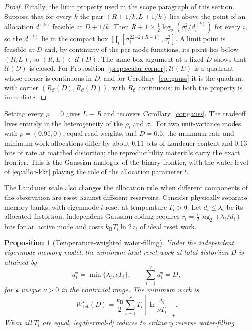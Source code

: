 \documentclass[letterpaper,onecolumn]{IEEEtran}
\newtheorem{proposition}{Proposition}
\theoremstyle{definition}
\theoremstyle{remark}
\newcommand{\cC}{\mathcal{C}}
\newcommand{\1}{\mathbf{1}}
\newcommand{\kb}{k_{\mathrm B}}
\begin{document}
\begin{proof}
Finally, the limit property used in the scope paragraph of this section.
Suppose that for every $k$ the pair $(R+1/k,L+1/k)$ lies above the point of an
allocation $d^{(k)}$ feasible at $D+1/k$. Then
$R+1\ge\frac12\log_2(\sigma_i^2/d^{(k)}_i)$ for every $i$, so the $d^{(k)}$
lie in the compact box $\prod_i[\sigma_i^22^{-2(R+1)},\sigma_i^2]$. A limit
point is feasible at $D$ and, by continuity of the per-mode functions, its
point lies below $(R,L)$, so $(R,L)\in\mathcal U(D)$. The same box argument
at a fixed $D$ shows that $\mathcal U(D)$ is closed. For
Proposition~\ref{prop:scalar-corner}, $\mathcal U(D)$ is a quadrant whose
corner is continuous in $D$, and for Corollary~\ref{cor:gauss} it is the
quadrant with corner $(R_{\cC}(D),R_{\cC}(D))$, with $R_{\cC}$ continuous; in
both the property is immediate.
\end{proof}

Setting every $\rho_i=0$ gives $L\equiv R$ and recovers
Corollary~\ref{cor:gauss}. The tradeoff lives entirely in the heterogeneity
of the $\rho_i$ and $\sigma_i$. For two unit-variance modes with
$\rho=(0.95,0)$, equal read weights, and $D=0.5$, the minimum-rate and
minimum-work allocations differ by about $0.11$ bits of Landauer content and
$0.13$ bits of rate at matched distortion; the reproducibility materials
carry the exact frontier. This is the Gaussian analogue of the binary
frontier, with the water level of \eqref{eq:alloc-kkt} playing the role of
the allocation parameter $t$.

The Landauer scale also changes the allocation rule when different components
of the observation are reset against different reservoirs. Consider physically
separate memory banks, with eigenmode $i$ reset at temperature $T_i>0$. Let
$d_i\le\lambda_i$ be its allocated distortion. Independent Gaussian coding
requires $r_i=\frac12\log_2(\lambda_i/d_i)$ bits for an active mode and costs
$\kb T_i\ln2\,r_i$ of ideal reset work.

\begin{proposition}[Temperature-weighted water-filling]\label{prop:thermal-waterfill}
Under the independent eigenmode memory model, the minimum ideal reset work at
total distortion $D$ is attained by
\begin{equation}
 d_i^{\star}=\min\{\lambda_i,\nu T_i\},
 \qquad
 \sum_{i=1}^{r}d_i^{\star}=D,
 \label{eq:thermal-d}
\end{equation}
for a unique $\nu>0$ in the nontrivial range. The minimum work is
\begin{equation}
 \boxed{
 W_{\mathrm{het}}^{\star}(D)
 =\frac{\kb}{2}\sum_{i=1}^{r}T_i
 \left[\ln\frac{\lambda_i}{\nu T_i}\right]_+.}
 \label{eq:thermal-waterfill}
\end{equation}
When all $T_i$ are equal, \eqref{eq:thermal-d} reduces to ordinary reverse
water-filling.
\end{proposition}
\end{document}

